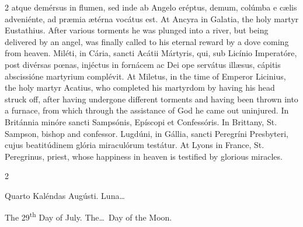 \begin{paracol}{2}
 atque demérsus in flumen, sed inde ab Angelo eréptus, demum, colúmba e cælis 
 adveniénte, ad præmia ætérna vocátus est.
\switchcolumn
{}
At Ancyra in Galatia, the holy 
 martyr Eustathius. After various torments he was plunged into a river, 
 but being delivered by an angel, was finally called to his eternal reward by 
 a dove coming from heaven.
\switchcolumn*
{}
Miléti, in Cária, sancti Acátii Mártyris, qui, sub Licínio Imperatóre, post divérsas pœnas, 
 injéctus in fornácem ac Dei ope servátus illæsus, cápitis abscissióne 
 martyrium complévit.
\switchcolumn
{}
At Miletus, in the time of Emperor 
 Licinius, the holy martyr Acatius, who completed his martyrdom by having his 
 head struck off, after having undergone different torments and having been 
 thrown into a furnace, from which through the assistance of God he came 
 out uninjured.
\switchcolumn*
{}
In Británnia minóre 
 sancti Sampsónis, Epíscopi et Confessóris.
\switchcolumn
{}
In Brittany, St. Sampson, bishop and 
 confessor.
\switchcolumn*
{}
Lugdúni, in Gállia, 
 sancti Peregríni Presbyteri, cujus beatitúdinem glória miraculórum testátur.
\switchcolumn
{}
At Lyons in France, St. Peregrinus, 
 priest, whose happiness in heaven is testified by glorious miracles.
\switchcolumn*
{}
\end{paracol}


\begin{paracol}{2}
\begin{center}{\color{gregoriocolor} Quarto Kaléndas Augústi. 
 Luna\dots\ }\end{center}
\switchcolumn
{}
\begin{center}{\color{gregoriocolor} The 
 29\textsuperscript{th} Day of 
 July. The\dots\ Day of the Moon.}\end{center}
\end{paracol}

